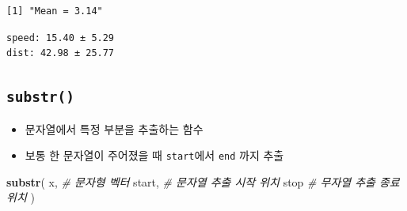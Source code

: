 \documentclass[
  11pt,
]{krantz}
\newenvironment{Shaded}{\begin{snugshade}}{\end{snugshade}}
\newcommand{\CharTok}[1]{\textcolor[rgb]{0.5,0.5,0.5}{#1}}
\newcommand{\CommentTok}[1]{\textcolor[rgb]{0.37,0.37,0.37}{\textit{#1}}}
\newcommand{\DataTypeTok}[1]{\textcolor[rgb]{0.27,0.27,0.27}{#1}}
\newcommand{\DecValTok}[1]{\textcolor[rgb]{0.06,0.06,0.06}{#1}}
\newcommand{\KeywordTok}[1]{\textcolor[rgb]{0.27,0.27,0.27}{\textbf{#1}}}
\newcommand{\NormalTok}[1]{#1}
\newcommand{\StringTok}[1]{\textcolor[rgb]{0.5,0.5,0.5}{#1}}
\providecommand{\tightlist}{%
  \setlength{\itemsep}{0pt}\setlength{\parskip}{0pt}}
\begin{document}
\begin{verbatim}
[1] "Mean = 3.14"
\end{verbatim}

\begin{Shaded}
\end{Shaded}

\begin{verbatim}
speed: 15.40 ± 5.29
dist: 42.98 ± 25.77
\end{verbatim}

\normalsize

\hypertarget{substr}{%
\subsection{\texorpdfstring{\textbf{\texttt{substr()}}}{substr()}}\label{substr}}

\begin{itemize}
\tightlist
\item
  문자열에서 특정 부분을 추출하는 함수
\item
  보통 한 문자열이 주어졌을 때 \texttt{start}에서 \texttt{end} 까지 추출
\end{itemize}

\footnotesize

\begin{Shaded}
\begin{Highlighting}[]
\KeywordTok{substr}\NormalTok{(}
\NormalTok{  x, }\CommentTok{# 문자형 벡터}
\NormalTok{  start, }\CommentTok{# 문자열 추출 시작 위치}
\NormalTok{  stop }\CommentTok{# 무자열 추출 종료 위치}
\NormalTok{)}
\end{Highlighting}
\end{Shaded}
\end{document}
